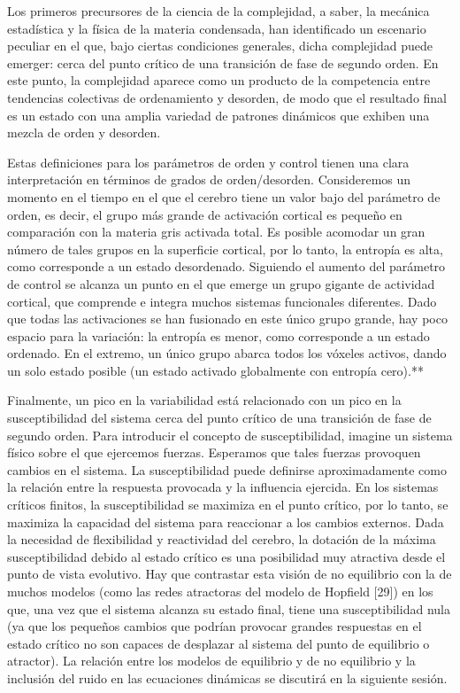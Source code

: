 Los primeros precursores de la ciencia de la complejidad, a saber, la mecánica estadística y la física de la materia condensada, han identificado un escenario peculiar en el que, bajo ciertas condiciones generales, dicha complejidad puede emerger: cerca del punto crítico de una transición de fase de segundo orden. En este punto, la complejidad aparece como un producto de la competencia entre tendencias colectivas de ordenamiento y desorden, de modo que el resultado final es un estado con una amplia variedad de patrones dinámicos que exhiben una mezcla de orden y desorden.

Estas definiciones para los parámetros de orden y control tienen una clara interpretación en términos de grados de orden/desorden. Consideremos un momento en el tiempo en el que el cerebro tiene un valor bajo del parámetro de orden, es decir, el grupo más grande de activación cortical es pequeño en comparación con la materia gris activada total. Es posible acomodar un gran número de tales grupos en la superficie cortical, por lo tanto, la entropía es alta, como corresponde a un estado desordenado. Siguiendo el aumento del parámetro de control se alcanza un punto en el que emerge un grupo gigante de actividad cortical, que comprende e integra muchos sistemas funcionales diferentes. Dado que todas las activaciones se han fusionado en este único grupo grande, hay poco espacio para la variación: la entropía es menor, como corresponde a un estado ordenado. En el extremo, un único grupo abarca todos los vóxeles activos, dando un solo estado posible (un estado activado globalmente con entropía cero).**


Finalmente, un pico en la variabilidad está relacionado con un pico en la susceptibilidad del sistema cerca del punto crítico de una transición de fase de segundo orden. Para introducir el concepto de susceptibilidad, imagine un sistema físico sobre el que ejercemos fuerzas. Esperamos que tales fuerzas provoquen cambios en el sistema. La susceptibilidad puede definirse aproximadamente como la relación entre la respuesta provocada y la influencia ejercida. En los sistemas críticos finitos, la susceptibilidad se maximiza en el punto crítico, por lo tanto, se maximiza la capacidad del sistema para reaccionar a los cambios externos. Dada la necesidad de flexibilidad y reactividad del cerebro, la dotación de la máxima susceptibilidad debido al estado crítico es una posibilidad muy atractiva desde el punto de vista evolutivo. Hay que contrastar esta visión de no equilibrio con la de muchos modelos (como las redes atractoras del modelo de Hopfield [29]) en los que, una vez que el sistema alcanza su estado final, tiene una susceptibilidad nula (ya que los pequeños cambios que podrían provocar grandes respuestas en el estado crítico no son capaces de desplazar al sistema del punto de equilibrio o atractor). La relación entre los modelos de equilibrio y de no equilibrio y la inclusión del ruido en las ecuaciones dinámicas se discutirá en la siguiente sesión.





